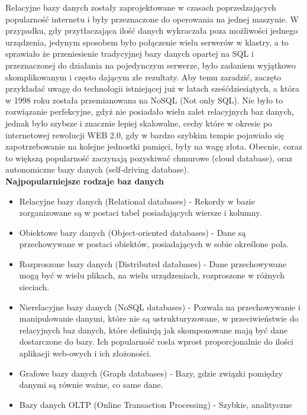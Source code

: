 \documentclass[12pt, a4paper]{article}
\begin{document}
\begin{sloppypar}
{{    Relacyjne bazy danych zostały zaprojektowane w czasach poprzedzających popularność
    internetu i były przeznaczone do operowania na jednej maszynie. W przypadku, gdy
    przytłaczająca ilość danych wykraczała poza możliwości jednego urządzenia, jedynym
    sposobem było połączenie wielu serwerów w klastry, a to sprawiało że przeniesienie
    tradycyjnej bazy danych opartej na SQL i przeznaczonej do działania na pojedynczym
    serwerze, było zadaniem wyjątkowo skomplikowanym i często dającym złe rezultaty.
    Aby temu zaradzić, zaczęto przykładać uwagę do technologii istniejącej już w latach
    sześćdziesiątych, a która w 1998 roku została przemianowana na NoSQL (Not only SQL).
    Nie było to rozwiązanie perfekcyjne, gdyż nie posiadało wielu zalet relacyjnych baz
    danych, jednak było szybsze i znacznie lepiej skalowalne, cechy które w okresie po
    internetowej rewolucji WEB 2.0, gdy w bardzo szybkim tempie pojawiało się zapotrzebowanie
    na kolejne jednostki pamięci, były na wagę złota. Obecnie, coraz to większą popularność
    zaczynają pozyskiwać chmurowe (cloud database), oraz autonomiczne bazy danych
    (self-driving database).\\
    {\large \bfseries Najpopularniejsze rodzaje baz danych} \cite{oracle-db}
    \begin{itemize}
      \item Relacyjne bazy danych (Relational databases) - Rekordy w bazie zorganizowane
      są w postaci tabel posiadających wiersze i kolumny.
      \item Obiektowe bazy danych (Object-oriented databases) - Dane są przechowywane w
      postaci obiektów, posiadających w sobie określone pola.
      \item Rozproszone bazy danych (Distributed databases) - Dane przechowywane mogą być
      w wielu plikach, na wielu urządzeniach, rozproszone w różnych sieciach.
      \item Nierelacyjne bazy danych (NoSQL databases) - Pozwala na przechowywanie i
      manipulowanie danymi, które nie są ustrukturyzowane, w przeciwieństwie do relacyjnych
      baz danych, które definiują jak skomponowane mają być dane dostarczone do bazy. Ich
      popularność rosła wprost proporcjonalnie do ilości aplikacji web-owych i ich
      złożoności.
      \item Grafowe bazy danych (Graph databases) - Bazy, gdzie związki pomiędzy
      danymi są równie ważne, co same dane.
      \item Bazy danych OLTP (Online Transaction Processing) - Szybkie, analityczne

\end{itemize}}}
\end{sloppypar}
\end{document}
